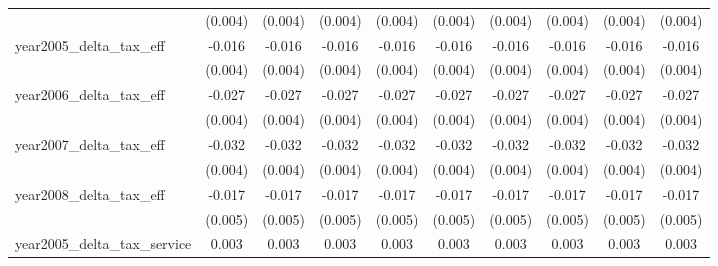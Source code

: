 {\begin{tabular}{l*{9}{c}}
            &     (0.004)         &     (0.004)         &     (0.004)         &     (0.004)         &     (0.004)         &     (0.004)         &     (0.004)         &     (0.004)         &     (0.004)         \\
[1em]
year2005_delta_tax_eff&      -0.016\sym{***}&      -0.016\sym{***}&      -0.016\sym{***}&      -0.016\sym{***}&      -0.016\sym{***}&      -0.016\sym{***}&      -0.016\sym{***}&      -0.016\sym{***}&      -0.016\sym{***}\\
            &     (0.004)         &     (0.004)         &     (0.004)         &     (0.004)         &     (0.004)         &     (0.004)         &     (0.004)         &     (0.004)         &     (0.004)         \\
[1em]
year2006_delta_tax_eff&      -0.027\sym{***}&      -0.027\sym{***}&      -0.027\sym{***}&      -0.027\sym{***}&      -0.027\sym{***}&      -0.027\sym{***}&      -0.027\sym{***}&      -0.027\sym{***}&      -0.027\sym{***}\\
            &     (0.004)         &     (0.004)         &     (0.004)         &     (0.004)         &     (0.004)         &     (0.004)         &     (0.004)         &     (0.004)         &     (0.004)         \\
[1em]
year2007_delta_tax_eff&      -0.032\sym{***}&      -0.032\sym{***}&      -0.032\sym{***}&      -0.032\sym{***}&      -0.032\sym{***}&      -0.032\sym{***}&      -0.032\sym{***}&      -0.032\sym{***}&      -0.032\sym{***}\\
            &     (0.004)         &     (0.004)         &     (0.004)         &     (0.004)         &     (0.004)         &     (0.004)         &     (0.004)         &     (0.004)         &     (0.004)         \\
[1em]
year2008_delta_tax_eff&      -0.017\sym{***}&      -0.017\sym{***}&      -0.017\sym{***}&      -0.017\sym{***}&      -0.017\sym{***}&      -0.017\sym{***}&      -0.017\sym{***}&      -0.017\sym{***}&      -0.017\sym{***}\\
            &     (0.005)         &     (0.005)         &     (0.005)         &     (0.005)         &     (0.005)         &     (0.005)         &     (0.005)         &     (0.005)         &     (0.005)         \\
[1em]
year2005_delta_tax_service&       0.003         &       0.003         &       0.003         &       0.003         &       0.003         &       0.003         &       0.003         &       0.003         &       0.003         \\

\end{tabular}}

